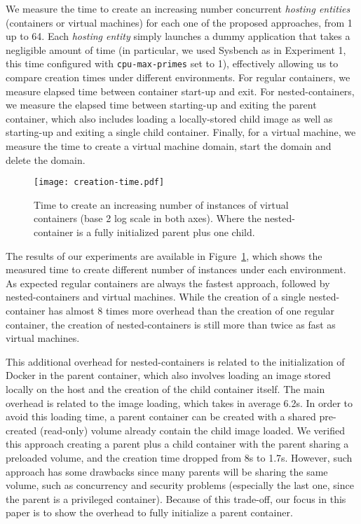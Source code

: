 \documentclass[conference]{IEEEtran}
\begin{document}
We measure the time to create an increasing number concurrent \textit{hosting
entities} (containers or virtual machines) for each one of the proposed
approaches, from 1 up to 64. Each \textit{hosting entity} simply launches a
dummy application that takes a negligible amount of time (in particular, we
used Sysbench as in Experiment 1, this time configured with
\texttt{cpu-max-primes} set to 1), effectively allowing us to compare creation
times under different environments. For regular containers, we measure elapsed
time between container start-up and exit.  For nested-containers, we measure
the elapsed time between starting-up and exiting the parent container, which
also includes loading a locally-stored child image as well as starting-up and
exiting a single child container.  Finally, for a virtual machine, we measure
the time to create a virtual machine domain, start the domain and delete the
domain.

\begin{figure}[bth!]
    \center
    \texttt{[image: creation-time.pdf]}
    \caption{Time to create an increasing number of instances of virtual
    containers (base 2 log scale in both axes). Where the nested-container is a 
fully initialized parent plus one child.}
    \label{fig:creation-time}
\end{figure}

The results of our experiments are available in
Figure~\ref{fig:creation-time}, which shows the measured time to create
different number of instances under each environment.  As expected regular
containers are always the fastest approach, followed by nested-containers and
virtual machines.
While the creation of a single nested-container has almost 8 times more
overhead than the creation of one regular container, the creation of  
nested-containers is still more than twice as fast as virtual machines.  

This additional overhead for nested-containers is related to the initialization 
of Docker in the parent container, which also involves loading an image stored 
locally on the host and the creation of the child container itself. The 
main overhead is related to the image loading, which takes in average 6.2s. In 
order to avoid this loading time, a parent container can be created with 
a shared pre-created (read-only) volume already contain the child image loaded. 
We verified this approach creating a parent plus a child container with the 
parent sharing a preloaded volume, and the creation time dropped from 8s to 
1.7s. However, such approach has some drawbacks since many parents will be 
sharing the same volume, such as concurrency and security problems (especially 
the last one, since the parent is a privileged container). Because of this 
trade-off, our focus in this paper is to show the overhead to fully initialize 
a parent container.
\end{document}
